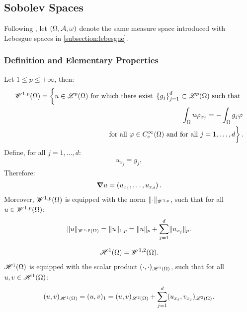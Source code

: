 \newpage
\subsection{Sobolev Spaces}

Following \cite[p.~267]{Brezis2010}, let $(\Omega, \mathcal{A}, \omega)$ denote the same measure space introduced with Lebesgue spaces in \cref{subsection:lebesgue}.

\subsubsection{Definition and Elementary Properties}

\begin{definition}
    Let $1 \leq p \leq +\infty$, then:
    \begin{align} %
        \SpaceWkp{1}{p}(\Omega) = \left\{ \vphantom{\int_{\Omega}} u \in \SpaceLp{p}(\Omega) \text{ for which there exist } \left\{ g_j \right\}_{j = 1}^{d} \subset \SpaceLp{p}(\Omega) \text{ such that } \right. \notag \\ 
        \left. \int_{\Omega} u \varphi_{x_j} = - \int_{\Omega} g_j \varphi \right. \notag \\
        \left. \text{ for all } \varphi \in C_c^{\infty}(\Omega) \text{ and for all } j = 1, \dots, d \vphantom{\int_{\Omega}} \right\}.
    \end{align}
    Define, for all $j = 1, \dots, d$:
    \begin{align}
        u_{x_j} = g_j,
    \end{align}
    Therefore:
    \begin{align}
        \bm{\nabla} u = \left( u_{x_1}, \dots, u_{x_d} \right).
    \end{align}
    Moreover, $\mathscr{W}^{1, p}(\Omega)$ is equipped with the norm $\lVert \cdot \rVert_{\mathscr{W}^{1, p}}$, such that for all $u \in \mathscr{W}^{1, p}(\Omega)$:
    \begin{align}
        \lVert u \rVert_{\mathscr{W}^{1, p}(\Omega)} = \lVert u \rVert_{1, p} = \lVert u \rVert_p + \sum_{j = 1}^d \lVert u_{x_j} \rVert_p.
    \end{align}
\end{definition}

\begin{definition}
    \begin{align}
        \mathscr{H}^{1}(\Omega) = \mathscr{W}^{1, 2}(\Omega).
    \end{align}
    $\mathscr{H}^{1}(\Omega)$ is equipped with the scalar product $(\cdot, \cdot)_{\mathscr{H}^{1}(\Omega)}$, such that for all $u, v \in \mathscr{H}^{1}(\Omega)$:
    \begin{align}
        (u, v)_{\mathscr{H}^{1}(\Omega)} = (u, v)_1 = (u, v)_{\mathscr{L}^{2}(\Omega)} + \sum_{j = 1}^d (u_{x_j}, v_{x_j})_{\mathscr{L}^{2}(\Omega)}.
    \end{align}
\end{definition}

